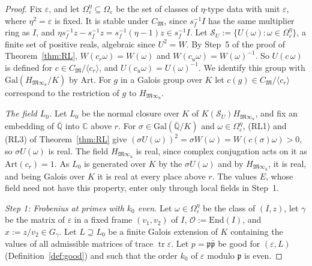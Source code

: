 \documentclass[11pt]{amsart}
\numberwithin{equation}{section}
\theoremstyle{plain}
\theoremstyle{definition}
\theoremstyle{remark}
\begin{document}
\begin{proof}
Fix \(\varepsilon\), and let \(\Omega^\eta_\varepsilon\subseteq\Omega_\varepsilon\) be the set of classes of \(\eta\)-type data with unit \(\varepsilon\), where \(\eta^2=\varepsilon\) is fixed. It is stable under \(C_{\mathfrak M}\), since \(s_f^{-1}I\) has the same multiplier ring as \(I\), and \(\eta s_f^{-1}z-s_f^{-1}z=s_f^{-1}(\eta-1)z\in s_f^{-1}I\). Let \(\mathcal S_U:=\{U(\omega):\omega\in\Omega^\eta_\varepsilon\}\), a finite set of positive reals, algebraic since \(U^2=W\). By Step~5 of the proof of Theorem~\ref{thm:RL}, \(W(c_r\omega)=W(\omega)\) and \(W(c_u\omega)=W(\omega)^{-1}\). So \(U(c\,\omega)\) is defined for \(c\in C_{\mathfrak M}/\langle c_r\rangle\), and \(U(c_u\omega)=U(\omega)^{-1}\). We identify this group with \(\mathrm{Gal}(H_{\mathfrak M\infty_u}/K)\) by \(\mathrm{Art}\). For \(g\) in a Galois group over \(K\) let \(c(g)\in C_{\mathfrak M}/\langle c_r\rangle\) correspond to the restriction of \(g\) to \(H_{\mathfrak M\infty_u}\).

\emph{The field \(L_0\).} Let \(L_0\) be the normal closure over \(K\) of \(K(\mathcal S_U)H_{\mathfrak M\infty_u}\), and fix an embedding of \(\overline{\mathbb Q}\) into \(\mathbb C\) above \(r\). For \(\sigma\in\mathrm{Gal}(\overline{\mathbb Q}/K)\) and \(\omega\in\Omega^\eta_\varepsilon\), (RL1) and (RL3) of Theorem~\ref{thm:RL} give \((\sigma U(\omega))^2=\sigma W(\omega)=W(c(\sigma)\omega)>0\), so \(\sigma U(\omega)\) is real. The field \(H_{\mathfrak M\infty_u}\) is real, since complex conjugation acts on it as \(\mathrm{Art}(c_r)=1\). As \(L_0\) is generated over \(K\) by the \(\sigma U(\omega)\) and by \(H_{\mathfrak M\infty_u}\), it is real, and being Galois over \(K\) it is real at every place above \(r\). The values \(E\), whose field need not have this property, enter only through local fields in Step~1.

\emph{Step 1: Frobenius at primes with \(k_0\) even.} Let \(\omega\in\Omega^\eta_\varepsilon\) be the class of \((I,z)\), let \(\gamma\) be the matrix of \(\varepsilon\) in a fixed frame \((v_1,v_2)\) of \(I\), \(\mathcal O:=\mathrm{End}(I)\), and \(x:=z/v_2\in G_\gamma\). Let \(L\supseteq L_0\) be a finite Galois extension of \(K\) containing the values of all admissible matrices of trace \(\operatorname{tr}\varepsilon\). Let \(p=\mathfrak p\bar{\mathfrak p}\) be good for \((\varepsilon,L)\) (Definition~\ref{def:good}) and such that the order \(k_0\) of \(\varepsilon\) modulo \(\mathfrak p\) is even.


\end{proof}
\end{document}
